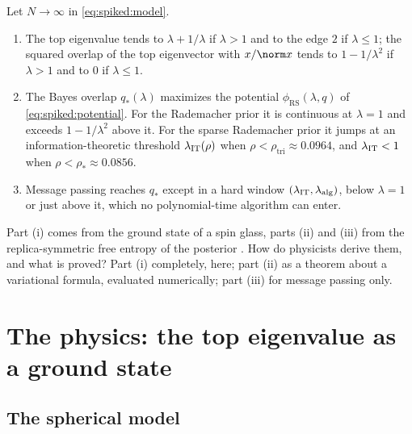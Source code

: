 \begin{refsection}
\begin{physicsbox}
Let $N\to\infty$ in \eqref{eq:spiked:model}.
\begin{enumerate}
\item The top eigenvalue tends to $\lambda+1/\lambda$ if $\lambda>1$ and to the edge $2$ if $\lambda\le1$; the squared overlap of the top eigenvector with $x/\norm x$ tends to $1-1/\lambda^2$ if $\lambda>1$ and to $0$ if $\lambda\le1$.
\item The Bayes overlap $q_*(\lambda)$ maximizes the potential $\phi_{\mathrm{RS}}(\lambda,q)$ of \eqref{eq:spiked:potential}. For the Rademacher prior it is continuous at $\lambda=1$ and exceeds $1-1/\lambda^2$ above it. For the sparse Rademacher prior it jumps at an information-theoretic threshold $\lambda_{\mathrm{IT}}(\rho)$ when $\rho<\rho_{\mathrm{tri}}\approx0.0964$, and $\lambda_{\mathrm{IT}}<1$ when $\rho<\rho_*\approx0.0856$.
\item Message passing reaches $q_*$ except in a hard window $(\lambda_{\mathrm{IT}},\lambda_{\mathrm{alg}})$, below $\lambda=1$ or just above it, which no polynomial-time algorithm can enter.
\end{enumerate}
\end{physicsbox}

Part (i) comes from the ground state of a spin glass, parts (ii) and (iii) from the replica-symmetric free entropy of the posterior \parencite{LesieurKrzakalaZdeborova2017}. How do physicists derive them, and what is proved? Part (i) completely, here; part (ii) as a theorem about a variational formula, evaluated numerically; part (iii) for message passing only.

\section{The physics: the top eigenvalue as a ground state}\label{sec:spiked:physics}

\subsection{The spherical model}\label{sec:spiked:spherical}


\end{refsection}
